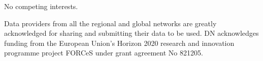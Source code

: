 \documentclass[journal abbreviation, manuscript]{copernicus}
\begin{document}



No competing interests.


\begin{acknowledgements}
 Data providers from all the regional and global networks are greatly acknowledged for sharing and submitting their data to be used. DN acknowledges funding from the European Union’s Horizon 2020 research and innovation programme project FORCeS under grant agreement No 821205.
\end{acknowledgements}














\end{document}
